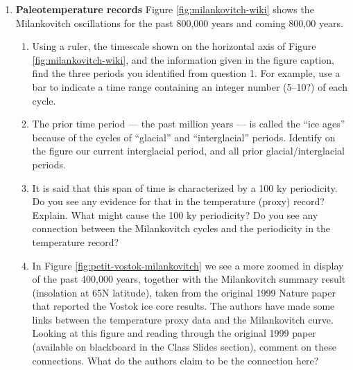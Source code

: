\documentclass[12pt]{article}
\begin{document}
\begin{enumerate}
\item {\bf Paleotemperature records} Figure \ref{fig:milankovitch-wiki} shows the Milankovitch oscillations for the past 800,000 years and coming 800,00  years.
	\begin{enumerate}
	\item Using a ruler, the timescale shown on the horizontal axis of Figure \ref{fig:milankovitch-wiki}, and the information given in the figure caption, find the three periods you identified from question 1. For example, use a bar to indicate a time range containing an integer number (5--10?) of each cycle.
	\item The prior time period --- the past million years --- is called the ``ice ages'' because of the cycles of ``glacial'' and ``interglacial'' periods.  Identify on the figure our current interglacial period, and all prior glacial/interglacial periods.  
	\item It is said that this span of time is characterized by a 100 ky periodicity.  Do you see any evidence for that in the temperature (proxy) record? Explain.  What might cause the 100 ky periodicity?  Do you see any connection between the Milankovitch cycles and the periodicity in the temperature record?
	\item In Figure \ref{fig:petit-vostok-milankovitch} we see a more zoomed in display of the past 400,000 years, together with the Milankovitch summary result (insolation at 65N latitude), taken from the original 1999 Nature paper that reported the Vostok ice core results.  The authors have made some links between the temperature proxy data and the Milankovitch curve.  Looking at this figure and reading through the original 1999 paper (available on blackboard in the Class Slides section), comment on these connections.  What do the authors claim to be the connection here?
	\end{enumerate}

\end{enumerate}

\newpage


\end{document}
